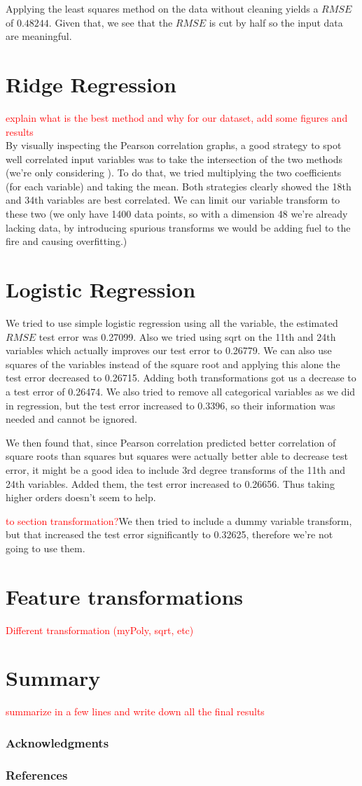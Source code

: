 \documentclass{article} %
\begin{document}
Applying the least squares method on the data without cleaning yields a $RMSE$ of $0.48244$. Given that, we see that the $RMSE$ is cut by half so the input data are meaningful.
\section{Ridge Regression}
\textcolor{red}{explain what is the best method and why for our dataset, add some figures and results}\\

By visually inspecting the Pearson correlation graphs, a good strategy to spot well correlated input variables was to take the intersection of the two methods (we’re only considering ). To do that, we tried multiplying the two coefficients (for each variable) and taking the mean. Both strategies clearly showed the 18th and 34th variables are best correlated. We can limit our variable transform to these two (we only have 1400 data points, so with a dimension 48 we’re already lacking data, by introducing spurious transforms we would be adding fuel to the fire and causing overfitting.)
\section{Logistic Regression}
We tried to use simple logistic regression using all the variable, the estimated $RMSE$ test error was 0.27099. Also we tried using sqrt on the 11th and 24th variables which actually improves our test error to 0.26779. We can also use squares of the variables instead of the square root and applying this alone the test error decreased to 0.26715. Adding both transformations got us a decrease to a test error of 0.26474. We also tried to remove all categorical variables as we did in regression, but the test error increased to 0.3396, so their information was needed and cannot be ignored.

We then found that, since Pearson correlation predicted better correlation of square roots than squares but squares were actually better able to decrease test error, it might be a good idea to include 3rd degree transforms of the 11th and 24th variables. Added them, the test error increased to 0.26656. Thus taking higher orders doesn’t seem to help.

\textcolor{red}{to section transformation?}We then tried to include a dummy variable transform, but that increased the test error significantly to 0.32625, therefore we’re not going to use them.
\section{Feature transformations}
\textcolor{red}{Different transformation (myPoly, sqrt, etc)}
\section{Summary}
\textcolor{red}{summarize in a few lines and write down all the final results}


\subsubsection*{Acknowledgments}


\subsubsection*{References}
\end{document}
